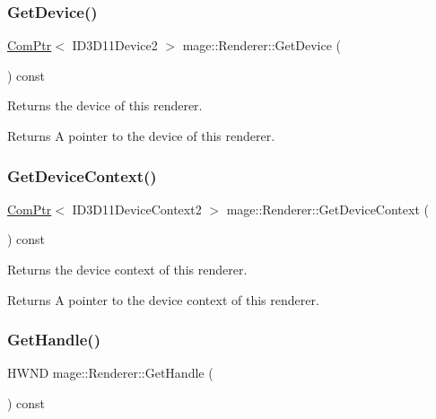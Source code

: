 \subsubsection{\texorpdfstring{Get\+Device()}{GetDevice()}}
{\footnotesize\ttfamily \hyperlink{namespacemage_ae74f374780900893caa5555d1031fd79}{Com\+Ptr}$<$ I\+D3\+D11\+Device2 $>$ mage\+::\+Renderer\+::\+Get\+Device (\begin{DoxyParamCaption}{ }\end{DoxyParamCaption}) const}

Returns the device of this renderer.

\begin{DoxyReturn}{Returns}
A pointer to the device of this renderer. 
\end{DoxyReturn}
\hypertarget{classmage_1_1_renderer_a764ee3d8f3dea6aceb05f42bce80b147}{}\label{classmage_1_1_renderer_a764ee3d8f3dea6aceb05f42bce80b147} 
\subsubsection{\texorpdfstring{Get\+Device\+Context()}{GetDeviceContext()}}
{\footnotesize\ttfamily \hyperlink{namespacemage_ae74f374780900893caa5555d1031fd79}{Com\+Ptr}$<$ I\+D3\+D11\+Device\+Context2 $>$ mage\+::\+Renderer\+::\+Get\+Device\+Context (\begin{DoxyParamCaption}{ }\end{DoxyParamCaption}) const}

Returns the device context of this renderer.

\begin{DoxyReturn}{Returns}
A pointer to the device context of this renderer. 
\end{DoxyReturn}
\hypertarget{classmage_1_1_renderer_a11d47495a47c58a0f67aae3110f9f519}{}\label{classmage_1_1_renderer_a11d47495a47c58a0f67aae3110f9f519} 
\subsubsection{\texorpdfstring{Get\+Handle()}{GetHandle()}}
{\footnotesize\ttfamily H\+W\+ND mage\+::\+Renderer\+::\+Get\+Handle (\begin{DoxyParamCaption}{ }\end{DoxyParamCaption}) const}

